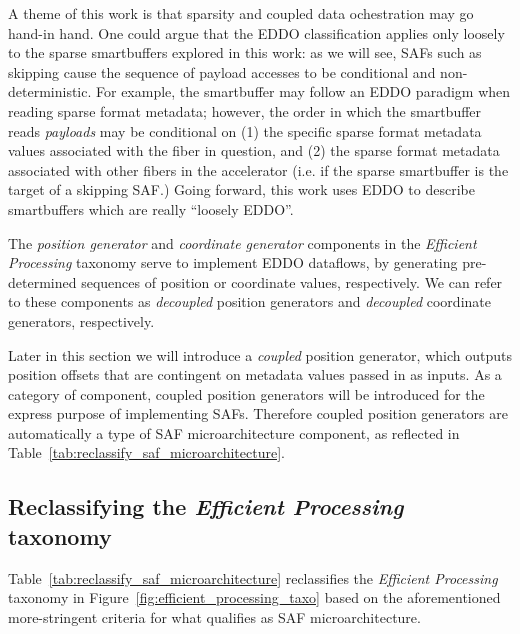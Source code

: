 A theme of this work is that sparsity and coupled data ochestration may go hand-in hand. One could argue that the EDDO classification applies only loosely to the sparse smartbuffers explored in this work: as we will see, SAFs such as skipping cause the sequence of payload accesses to be conditional and non-deterministic. For example, the smartbuffer may follow an EDDO paradigm when reading sparse format metadata; however, the order in which the smartbuffer reads \textit{payloads} may be conditional on (1) the specific sparse format metadata values associated with the fiber in question, and (2) the sparse format metadata associated with other fibers in the accelerator (i.e. if the sparse smartbuffer is the target of a skipping SAF.) Going forward, this work uses EDDO to describe smartbuffers which are really ``loosely EDDO''.

The \textit{position generator} and \textit{coordinate generator} components in the \textit{Efficient Processing} taxonomy serve to implement EDDO dataflows, by generating pre-determined sequences of position or coordinate values, respectively. We can refer to these components as \textit{decoupled} position generators and \textit{decoupled} coordinate generators, respectively.

Later in this section we will introduce a \textit{coupled} position generator, which outputs position offsets that are contingent on metadata values passed in as inputs. As a category of component, coupled position generators will be introduced for the express purpose of implementing SAFs. Therefore coupled position generators are automatically a type of SAF microarchitecture component, as reflected in Table~\ref{tab:reclassify_saf_microarchitecture}.

\subsection{Reclassifying the \textit{Efficient Processing} taxonomy}

Table~\ref{tab:reclassify_saf_microarchitecture} reclassifies the \textit{Efficient Processing} taxonomy in Figure~\ref{fig:efficient_processing_taxo} based on the aforementioned more-stringent criteria for what qualifies as SAF microarchitecture.

